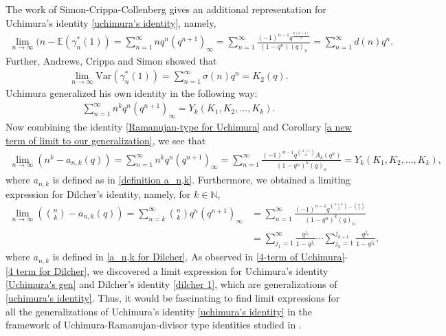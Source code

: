 \documentclass[11pt,reqno]{amsart}
\renewcommand{\(}{\left\(}
\renewcommand{\)}{\right\)}
\renewcommand{\[}{\left\[}
\renewcommand{\]}{\right\]}
\numberwithin{equation}{section}
\theoremstyle{plain}
\begin{document}
The work of Simon-Crippa-Collenberg gives an additional representation for Uchimura's identity \eqref{uchimura's identity},  namely,  
\begin{align}\label{4-term of Uchimura}
\lim_{n\rightarrow \infty}(n-\mathbb{E}(\gamma^*_n(1)) = \sum_{n=1}^\infty nq^n(q^{n+1})_\infty=\sum_{n=1}^\infty \frac{(-1)^{n-1} q^{ \frac{n(n+1)}{2}}}{(1-q^n)(q)_n}=\sum_{n=1}^\infty d(n) q^n.  
\end{align}
Further,  Andrews,  Crippa and Simon showed that 
\begin{align*}
\lim_{n\rightarrow \infty} \mathrm{Var}(\gamma^*_n(1))=\sum_{n=1}^\infty \sigma(n)q^n= K_2(q).  
\end{align*}
Uchimura generalized his own identity in the following way: 
\begin{align*}
\sum_{n=1}^\infty n^k q^n(q^{n+1})_\infty = Y_k(K_1,K_2,\dots,K_k).  
\end{align*}
Now combining the identity \eqref{Ramanujan-type for Uchimura} and Corollary \ref{a new term of limit to our generalization},  we see that 
\begin{align}\label{limit of Uchimura}
\lim_{n\rightarrow \infty}\left(n^k- a_{n,k}(q)\right) = \sum_{n=1}^\infty n^k q^n(q^{n+1})_\infty = \sum_{n=1}^\infty \frac{(-1)^{n-1} q^{ {n+1 \choose 2 } } A_k(q^n)}{(1-q^n)^k (q)_n}= Y_k(K_1,K_2,\dots,K_k),
\end{align}
where $a_{n,k}$ is defined as in \eqref{definition a_n,k}.  Furthermore,  we obtained a limiting expression for Dilcher's identity,   namely,  for $k \in \mathbb{N}$,  
\begin{align}\label{4 term for Dilcher}
\lim_{n \rightarrow \infty} \left(  {n \choose k} - a_{n, k}(q)  \right) = \sum_{n=k}^\infty {n\choose k} q^n(q^{n+1})_\infty & =\sum_{n=1}^\infty \frac{(-1)^{n-1}q^{{n+k \choose 2}-{k\choose 2}}}{(1-q^n)^k (q)_n} \nonumber \\ 
& =\sum_{j_1=1}^\infty\frac{q^{j_1}}{1-q^{j_1}} \cdots \sum_{j_k=1}^{j_{k-1}}\frac{q^{j_k}}{1-q^{j_k}},
\end{align}
where $a_{n,k}$ is defined in \eqref{a_n,k for Dilcher}.
As observed in \eqref{4-term of Uchimura}-\eqref{4 term for Dilcher},  we discovered a limit expression for Uchimura's identity \eqref{Uchimura's gen} and Dilcher's  identity \eqref{dilcher 1},  which are generalizations of \eqref{uchimura's identity}.  Thus,  it would be fascinating to find limit expressions for all the generalizations of Uchimura's identity \eqref{uchimura's identity} in the framework of Uchimura-Ramanujan-divisor type identities studied in \cite{ABEM24}.   
\end{document}
